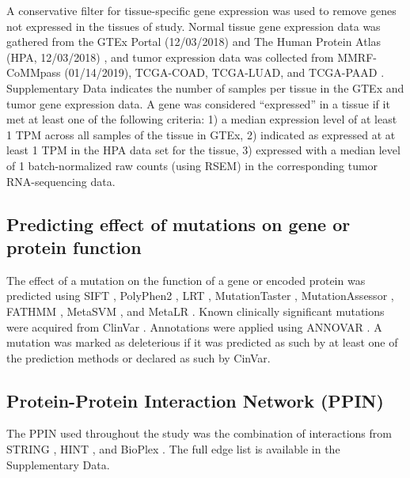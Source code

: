 \documentclass[english, 10pt, letterpaper]{article}
\begin{document}
A conservative filter for tissue-specific gene expression was used to remove genes not expressed in the tissues of study. 
Normal tissue gene expression data was gathered from the GTEx Portal (12/03/2018) \cite{GTExConsortium2017} and The Human Protein Atlas (HPA, 12/03/2018) \cite{Uhlen2015, Uhlen2016}, and tumor expression data was collected from MMRF-CoMMpass (01/14/2019), TCGA-COAD, TCGA-LUAD, and TCGA-PAAD \cite{Walker2019AAnalysis., CancerGenomeAtlasNetwork2012, CancerGenomeAtlasResearchNetwork2014, CancerGenomeAtlasResearchNetwork.Electronicaddress:andrew_aguirredfci.harvard.edu2017}. 
Supplementary Data indicates the number of samples per tissue in the GTEx and tumor gene expression data.
A gene was considered “expressed” in a tissue if it met at least one of the following criteria: 1) a median expression level of at least 1 TPM across all samples of the tissue in GTEx, 2) indicated as expressed at at least 1 TPM in the HPA data set for the tissue, 3) expressed with a median level of 1 batch-normalized raw counts (using RSEM) in the corresponding tumor RNA-sequencing data.


\subsection*{Predicting effect of mutations on gene or protein function}

The effect of a mutation on the function of a gene or encoded protein was predicted using SIFT \cite{Kumar2009, Vaser2016}, PolyPhen2 \cite{Adzhubei2010}, LRT \cite{Chun2009IdentificationGenomes.}, MutationTaster \cite{Schwarz2014MutationTaster2:Age.}, MutationAssessor \cite{Reva2007DeterminantsOptimization., Reva2011}, FATHMM \cite{Shihab2013}, MetaSVM \cite{Dong2015ComparisonStudies.}, and MetaLR \cite{Dong2015ComparisonStudies.}.
Known clinically significant mutations were acquired from ClinVar \cite{Landrum2018ClinVar:Evidence.}.
Annotations were applied using ANNOVAR \cite{Wang2010ANNOVAR:Data.}.
A mutation was marked as deleterious if it was predicted as such by at least one of the prediction methods or declared as such by CinVar.


\subsection*{Protein-Protein Interaction Network (PPIN)}

The PPIN used throughout the study was the combination of interactions from STRING \cite{VonMering2005, Szklarczyk2019}, HINT \cite{Das2012}, and BioPlex \cite{Huttlin2015}.
The full edge list is available in the Supplementary Data.
\end{document}
